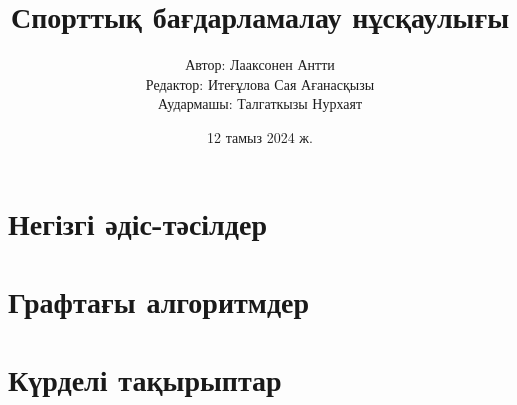 \documentclass[oneside,12pt,a4paper,kazakh]{book}
\date{12 тамыз 2024 ж.}
\title{\Huge Спорттық бағдарламалау нұсқаулығы}
\author{\Large Автор: Лааксонен Антти \\
Редактор: Итеғұлова Сая Ағанасқызы
\\
Аудармашы: Талгаткызы Нурхаят
}
\begin{document}


\frontmatter
\maketitle
\setcounter{tocdepth}{1}
\tableofcontents






\mainmatter
{}
\setcounter{page}{1}

\newcommand{\key}[1] {\textbf{#1}}

\part{Негізгі әдіс-тәсілдер}










\part{Графтағы алгоритмдер}










\part{Күрделі тақырыптар}











\cleardoublepage
{}
{}


\cleardoublepage
\printindex
\end{document}
